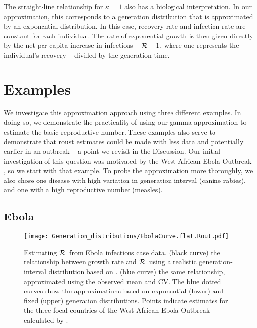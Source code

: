 \documentclass[12pt,]{article}
\newcommand{\RR}{\ensuremath{{\cal R}}}
\begin{document}
The straight-line relationship for $\kappa=1$ also has a biological interpretation. 
In our approximation, this corresponds to a generation distribution that is approximated by an exponential distribution. 
In this case, recovery rate and infection rate are constant for each individual.
The rate of exponential growth is then given directly by the net per capita increase in infections -- $\RR-1$, where one represents the individual's recovery -- divided by the generation time.

\section{Examples}

We investigate this approximation approach using three different examples. 
In doing so, we demonstrate the practicality of using our gamma approximation to estimate the basic reproductive number. 
These examples also serve to demonstrate that roust estimates could be made with less data and potentially earlier in an outbreak -- a point we revisit in the Discussion.
Our initial investigation of this question was motivated by the West African Ebola Outbreak \cite{WeitDush15}, so we start with that example. To probe the approximation more thoroughly, we also chose one disease with high variation in generation interval (canine rabies), and one with a high reproductive number (measles).

\subsection{Ebola}
\label{EbolaEx}

\begin{figure}[htbp] \centering
	\texttt{[image: Generation\_distributions/EbolaCurve.flat.Rout.pdf]}
	\caption{Estimating \RR~from Ebola infectious case data.
(black curve) the relationship between growth rate and \RR~using a realistic generation-interval distribution based on \cite{WHO14}.
(blue curve) the same relationship, approximated using the observed mean and CV. 
The blue dotted curves show the approximations based on exponential (lower) and fixed (upper) generation distributions.
Points indicate estimates for the three focal countries of the West African Ebola Outbreak calculated by \cite{WHO14}.
	\label{fig:EbolaCurve}}
\end{figure}
\end{document}
